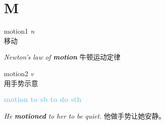 \section{M}

\item[] {
    \lettrine{motion}{1}  
    \textit{n} 
    \\
    移动

    \textit{Newton's law of \textbf{motion}}
    牛顿运动定律

} 

\item[] {
    \lettrine{motion}{2}  
    \textit{v} 
    \\
    用手势示意

    \textbf {
        \textcolor{SkyBlue} {
            motion to sb to do sth
        }
    }  

    \textit{He \textbf{motioned} to her to be quiet.}
    他做手势让她安静。

} 
